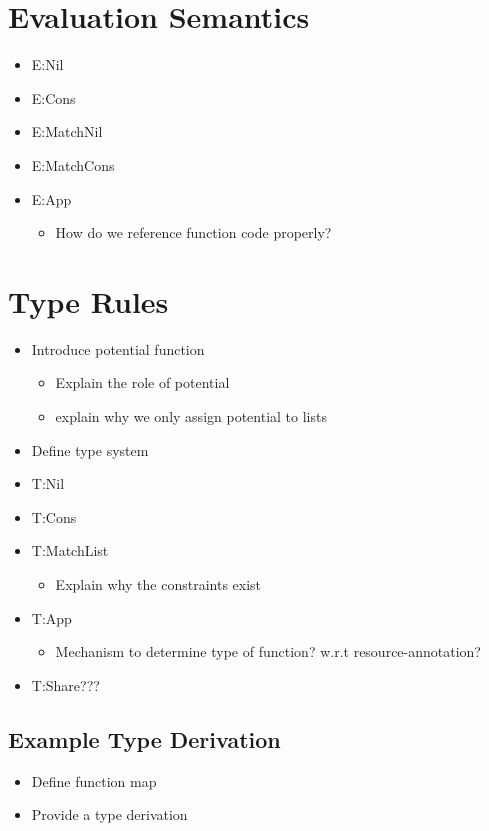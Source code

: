 \section{Evaluation Semantics}
\begin{itemize}
   \item E:Nil
   \item E:Cons
   \item E:MatchNil
   \item E:MatchCons
   \item E:App
      \begin{itemize}
         \item How do we reference function code properly?
      \end{itemize}
\end{itemize}

\section{Type Rules}
\begin{itemize}
   \item Introduce potential function
      \begin{itemize}
         \item Explain the role of potential
         \item explain why we only assign potential to lists
      \end{itemize}
   \item Define type system
   \item T:Nil
   \item T:Cons
   \item T:MatchList
      \begin{itemize}
         \item Explain why the constraints exist
      \end{itemize}
   \item T:App
      \begin{itemize}
         \item Mechanism to determine type of function? w.r.t resource-annotation?
      \end{itemize}
   \item T:Share???
\end{itemize}

\subsection{Example Type Derivation}
\begin{itemize}
   \item Define function map
   \item Provide a type derivation
\end{itemize}

